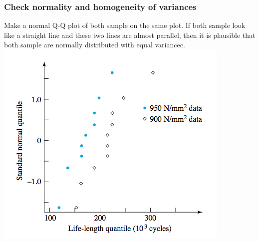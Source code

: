\documentclass[handout]{beamer}\usepackage[]{graphicx}\usepackage[]{color}
\numberwithin{equation}{section}
\begin{document}
\begin{frame}
\frametitle{\small Check normality and homogeneity of variances}
\scriptsize
Make a normal Q-Q plot of both sample on the same plot. If both sample look like a straight line and these two lines are almost parallel, then it is plausible that both sample are normally distributed with equal variancec.
 \includegraphics{../../fig/springsqq.png}
\end{frame}
\end{document}
